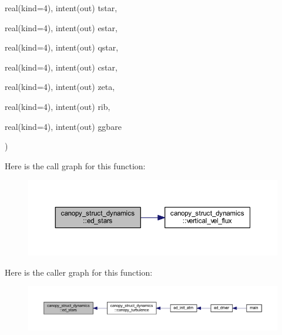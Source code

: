 {\begin{DoxyParamCaption}
\item[{real(kind=4), intent(out)}]{tstar, }
\item[{real(kind=4), intent(out)}]{estar, }
\item[{real(kind=4), intent(out)}]{qstar, }
\item[{real(kind=4), intent(out)}]{cstar, }
\item[{real(kind=4), intent(out)}]{zeta, }
\item[{real(kind=4), intent(out)}]{rib, }
\item[{real(kind=4), intent(out)}]{ggbare}
\end{DoxyParamCaption}
)}\hypertarget{namespacecanopy__struct__dynamics_aecb5209e48d8e43c4c1b214d31d3f7e2}{}\label{namespacecanopy__struct__dynamics_aecb5209e48d8e43c4c1b214d31d3f7e2}


Here is the call graph for this function\+:\nopagebreak
\begin{figure}[H]
\begin{center}
\leavevmode
\includegraphics[width=350pt]{namespacecanopy__struct__dynamics_aecb5209e48d8e43c4c1b214d31d3f7e2_cgraph}
\end{center}
\end{figure}




Here is the caller graph for this function\+:\nopagebreak
\begin{figure}[H]
\begin{center}
\leavevmode
\includegraphics[width=350pt]{namespacecanopy__struct__dynamics_aecb5209e48d8e43c4c1b214d31d3f7e2_icgraph}
\end{center}
\end{figure}


